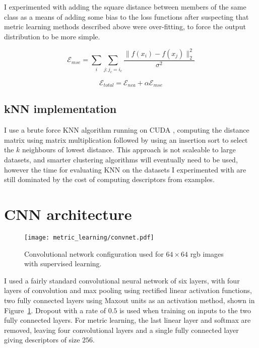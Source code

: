 I experimented with adding the square distance between members of the same class as a means of adding some bias to the loss functions after suspecting that metric learning methods described above were over-fitting, to force the output distribution to be more simple. 

\begin{equation}
\label{eqn:mse}
\mathcal{E}_{mse} = \sum_i{ \sum_{j:j_c = i_c}  \frac {{\lVert f(x_i) - f(x_j) \rVert^2_2}} {\sigma^2} }
\end{equation}

\begin{equation}
\label{eqn:mse_total}
\mathcal{E}_{total} =  \mathcal{E}_{nca} + \alpha \mathcal{E}_{mse}
\end{equation}


\subsection {kNN implementation}

I use a brute force \gls{KNN} algorithm running on CUDA \cite{Garcia2008}, computing the distance matrix using matrix multiplication followed by using an insertion sort to select the $ k $ neighbours of lowest distance. This approach is not scaleable to large datasets, and smarter clustering algorithms will eventually need to be used, however the time for evaluating \gls{KNN} on the datasets I experimented with are still dominated by the cost of computing descriptors from examples. 


\section {CNN architecture}


\begin{figure}[ht]
\centering
\texttt{[image: metric\_learning/convnet.pdf]}
\caption{Convolutional network configuration used for $64\times64$ rgb images with supervised learning.}
\label{fig:metric_convnet}
\end{figure}

I used a fairly standard convolutional neural network of six layers, with four layers of convolution and max pooling using rectified linear activation functions, two fully connected layers using Maxout \cite{Springenberg2013} units as an activation method, shown in Figure~\ref{fig:metric_convnet}. Dropout \cite{HintonDropout} with a rate of $ 0.5 $ is used when training on inputs to the two fully connected layers. For metric learning, the last linear layer and softmax are removed, leaving four convolutional layers and a single fully connected layer giving descriptors of size $ 256 $.

